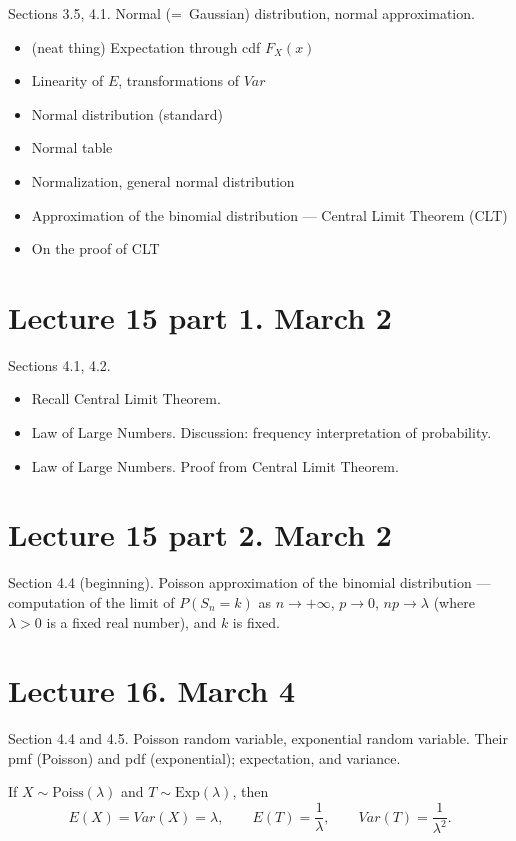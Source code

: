 \documentclass[letterpaper,11pt,oneside,reqno]{amsart}
\numberwithin{equation}{section}
\theoremstyle{definition}
\begin{document}
Sections 3.5, 4.1. 
Normal (=~Gaussian) distribution, normal approximation.
\begin{itemize}
	\item (neat thing) Expectation through cdf $F_X(x)$
	\item Linearity of $E$, transformations of $Var$
	\item Normal distribution (standard)
	\item Normal table
	\item Normalization, general normal distribution
	\item Approximation of the binomial distribution --- Central Limit Theorem (CLT)
	\item On the proof of CLT
\end{itemize}

\section*{Lecture 15 part 1. March 2}

Sections 4.1, 4.2.
\begin{itemize}
	\item Recall Central Limit Theorem. 
	\item Law of Large Numbers. Discussion: frequency interpretation of probability.
	\item Law of Large Numbers. Proof from Central Limit Theorem.
\end{itemize}

\section*{Lecture 15 part 2. March 2}

Section 4.4 (beginning). Poisson approximation of the binomial distribution
--- computation of the limit of 
$P(S_n=k)$ as $n\to+\infty$, $p\to0$, $np\to\lambda$ (where $\lambda>0$ is a fixed real
number), and $k$ is fixed.

\section*{Lecture 16. March 4}

Section 4.4 and 4.5. Poisson random variable, exponential random variable.
Their pmf (Poisson) and pdf (exponential); 
expectation, and variance. 

If $X\sim \mathrm{Poiss}(\lambda)$ and $T\sim \mathrm{Exp}(\lambda)$, then
\begin{equation*}
	E(X)=Var(X)=\lambda,\qquad E(T)=\frac{1}{\lambda},\qquad Var(T)=\frac{1}{\lambda^2}.
\end{equation*}
\end{document}
